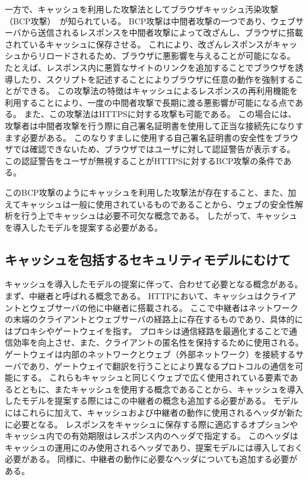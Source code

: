 \documentclass{css}
\begin{document}
一方で、キャッシュを利用した攻撃法としてブラウザキャッシュ汚染攻撃（BCP攻撃）~\cite{bcpattack}が知られている。
BCP攻撃は中間者攻撃の一つであり、ウェブサーバから送信されるレスポンスを中間者攻撃によって改ざんし、ブラウザに搭載されているキャッシュに保存させる。
これにより、改ざんレスポンスがキャッシュからリロードされるため、ブラウザに悪影響を与えることが可能になる。
たとえば、レスポンス内に悪質なサイトのリンクを追加することでブラウザを誘導したり、スクリプトを記述することによりブラウザに任意の動作を強制することができる。
この攻撃法の特徴はキャッシュによるレスポンスの再利用機能を利用することにより、一度の中間者攻撃で長期に渡る悪影響が可能になる点である。
また、この攻撃法はHTTPSに対する攻撃も可能である。
この場合には、攻撃者は中間者攻撃を行う際に自己署名証明書を使用して正当な接続先になりすます必要がある。
このなりすましに使用する自己署名証明書の安全性をブラウザでは確認できないため、ブラウザではユーザに対して認証警告が表示する。
この認証警告をユーザが無視することがHTTPSに対するBCP攻撃の条件である。

このBCP攻撃のようにキャッシュを利用した攻撃法が存在すること、また、加えてキャッシュは一般に使用されているものであることから、ウェブの安全性解析を行う上でキャッシュは必要不可欠な概念である。
したがって、キャッシュを導入したモデルを提案する必要がある。

\subsection{キャッシュを包括するセキュリティモデルにむけて}
キャッシュを導入したモデルの提案に伴って、合わせて必要となる概念がある。
まず、中継者と呼ばれる概念である。
HTTPにおいて、キャッシュはクライアントとウェブサーバの他に中継者に搭載される。
ここで中継者はネットワークの末端のクライアントとウェブサーバの経路上に存在するものであり、具体的にはプロキシやゲートウェイを指す。
プロキシは通信経路を最適化することで通信効率を向上させ、また、クライアントの匿名性を保持するために使用される。
ゲートウェイは内部のネットワークとウェブ（外部ネットワーク）を接続するサーバであり、ゲートウェイで翻訳を行うことにより異なるプロトコルの通信を可能にする。
これらもキャッシュと同じくウェブで広く使用されている要素であるとともに、またキャッシュを使用する概念であることから、キャッシュを導入したモデルを提案する際にはこの中継者の概念も追加する必要がある。
モデルにはこれらに加えて、キャッシュおよび中継者の動作に使用されるヘッダが新たに必要となる。
レスポンスをキャッシュに保存する際に適応するオプションやキャッシュ内での有効期限はレスポンス内のヘッダで指定する。
このヘッダはキャッシュの運用にのみ使用されるヘッダであり、提案モデルには導入しておく必要がある。
同様に、中継者の動作に必要なヘッダについても追加する必要がある。
\end{document}

